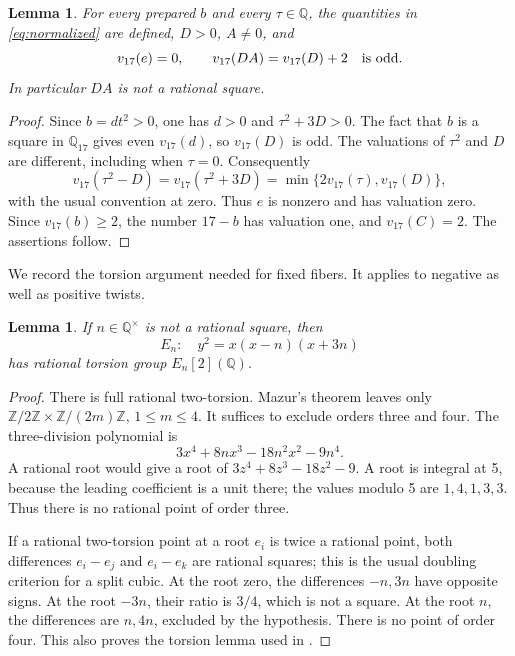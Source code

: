 \documentclass[11pt,a4paper]{article}
\newtheorem{lemma}[theorem]{Lemma}
\theoremstyle{remark}\newtheorem{remark}[theorem]{Remark}
\newcommand{\Q}{\mathbb Q}\newcommand{\Z}{\mathbb Z}
\begin{document}
\begin{lemma}\label{lem:odd17}
For every prepared $b$ and every $\tau\in\Q$, the quantities in
\eqref{eq:normalized} are defined, $D>0$, $A\ne0$, and
\[
 v_{17}(e)=0,\qquad
 v_{17}(DA)=v_{17}(D)+2\quad\hbox{is odd}.
\]
In particular $DA$ is not a rational square.
\end{lemma}
\begin{proof}
Since $b=dt^2>0$, one has $d>0$ and $\tau^2+3D>0$.
The fact that $b$ is a square in $\Q_{17}$ gives even $v_{17}(d)$,
so $v_{17}(D)$ is odd. The valuations of $\tau^2$ and $D$ are
different, including when $\tau=0$. Consequently
\[
 v_{17}(\tau^2-D)=v_{17}(\tau^2+3D)
                 =\min\{2v_{17}(\tau),v_{17}(D)\},
\]
with the usual convention at zero. Thus $e$ is nonzero and has
valuation zero. Since $v_{17}(b)\ge2$, the number $17-b$ has
valuation one, and $v_{17}(C)=2$. The assertions follow.
\end{proof}

We record the torsion argument needed for fixed fibers. It applies to
negative as well as positive twists.

\begin{lemma}\label{lem:torsion}
If $n\in\Q^\times$ is not a rational square, then
\[
 E_n:\quad y^2=x(x-n)(x+3n)
\]
has rational torsion group $E_n[2](\Q)$.
\end{lemma}
\begin{proof}
There is full rational two-torsion. Mazur's theorem
\cite[Introduction, Theorem~(8), p.~35]{Mazur} leaves only
$\Z/2\Z\times\Z/(2m)\Z$, $1\le m\le4$.
It suffices to exclude orders three and four.
The three-division polynomial is
\[
                   3x^4+8nx^3-18n^2x^2-9n^4.
\]
A rational root would give a root of $3z^4+8z^3-18z^2-9$.
A root is integral at 5, because the leading coefficient is a unit
there; the values modulo 5 are $1,4,1,3,3$. Thus there is no
rational point of order three.

If a rational two-torsion point at a root $e_i$ is twice a rational
point, both differences $e_i-e_j$ and $e_i-e_k$ are rational squares;
this is the usual doubling criterion for a split cubic. At the root
zero, the differences $-n,3n$ have opposite signs. At the root
$-3n$, their ratio is $3/4$, which is not a square. At the root
$n$, the differences are $n,4n$, excluded by the hypothesis. There
is no point of order four. This also proves the torsion lemma used
in \cite{Density}.
\end{proof}
\end{document}
